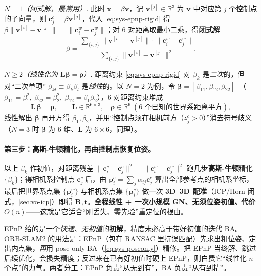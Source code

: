 \noindent\emph{$N=1$（闭式解，最常用）.}\; 此时 $\mathbf{x}=\beta\mathbf{v}$，记 $\mathbf{v}^{[j]}\in\mathbb{R}^3$ 为 $\mathbf{v}$ 中对应第 $j$ 个控制点的子向量，则 $\mathbf{c}_j^c=\beta\mathbf{v}^{[j]}$，代入 \cref{eq:sys-epnp-rigid} 得 $\beta\lVert\mathbf{v}^{[i]}-\mathbf{v}^{[j]}\rVert=\lVert\mathbf{c}_i^w-\mathbf{c}_j^w\rVert$；对 $6$ 对距离取最小二乘，得\textbf{闭式解}
\begin{equation}
\beta=\frac{\displaystyle\sum_{\{i,j\}}\big\lVert\mathbf{v}^{[i]}-\mathbf{v}^{[j]}\big\rVert\cdot\big\lVert\mathbf{c}_i^{w}-\mathbf{c}_j^{w}\big\rVert}
{\displaystyle\sum_{\{i,j\}}\big\lVert\mathbf{v}^{[i]}-\mathbf{v}^{[j]}\big\rVert^2}.
\label{eq:sys-epnp-beta1}
\end{equation}

\noindent\emph{$N\ge2$（线性化为 $\mathbf{L}\boldsymbol\beta=\boldsymbol\rho$）.}\; 距离约束 \cref{eq:sys-epnp-rigid} 对 $\beta_k$ 是\emph{二次}的，但对“二次单项” $\beta_{kl}\equiv\beta_k\beta_l$ 是\emph{线性}的。以 $N=2$ 为例，令 $\boldsymbol\beta=[\beta_{11},\beta_{12},\beta_{22}]^\top$（$\beta_{11}=\beta_1^2,\ \beta_{22}=\beta_2^2,\ \beta_{12}=\beta_1\beta_2$），$6$ 对距离约束堆成
\begin{equation}
\mathbf{L}\,\boldsymbol\beta=\boldsymbol\rho,\qquad \mathbf{L}\in\mathbb{R}^{6\times3},\quad \boldsymbol\rho\in\mathbb{R}^{6}\ (\text{$6$ 个已知的世界系距离平方}),
\label{eq:sys-epnp-Lbeta}
\end{equation}
线性解出 $\boldsymbol\beta$ 再开方得 $\beta_1,\beta_2$，并用“控制点须在相机前方（$z_j^c>0$）”消去符号歧义（$N=3$ 时 $\boldsymbol\beta$ 为 $6$ 维、$\mathbf{L}$ 为 $6\times6$，同理）。

\paragraph{第三步：高斯-牛顿精化，再由控制点恢复位姿。}
以上 $\beta_k$ 作初值，对距离残差 $\lVert\mathbf{c}_i^c-\mathbf{c}_j^c\rVert^2-\lVert\mathbf{c}_i^w-\mathbf{c}_j^w\rVert^2$ 跑几步\textbf{高斯-牛顿}精化 $\{\beta_k\}$；得相机系控制点 $\mathbf{c}_j^c$ 后，由 $\mathbf{p}_i^c=\sum_j\alpha_{ij}\mathbf{c}_j^c$ 算出全部参考点的相机系坐标，最后把世界系点集 $\{\mathbf{p}_i^w\}$ 与相机系点集 $\{\mathbf{p}_i^c\}$ 做一次 \textbf{3D--3D 配准}（ICP/Horn 闭式，\cref{sec:vo-icp}）即得 $\mathbf{R},\mathbf{t}$。\textbf{全程线性 + 一次小规模 GN、无须位姿初值、代价 $O(n)$}——这就是它适合“刚丢失、零先验”重定位的根由。

\begin{pitfall}
EPnP 给的是一个\emph{快速、无初值}的\textbf{初解}，精度未必高于带好初值的迭代 BA。ORB-SLAM2 的用法是：EPnP（包在 RANSAC 里抗误匹配）先求出粗位姿、定出内点集，\emph{再}用 pose-only BA（\cref{eq:sys-poseonly}）精修。把 EPnP 当终解、跳过后续优化，会损失精度；反过来在已有好初值时硬上 EPnP，则白费它“线性化 $n$ 个点”的力气。两者分工：EPnP 负责“从无到有”，BA 负责“从有到精”。
\end{pitfall}

